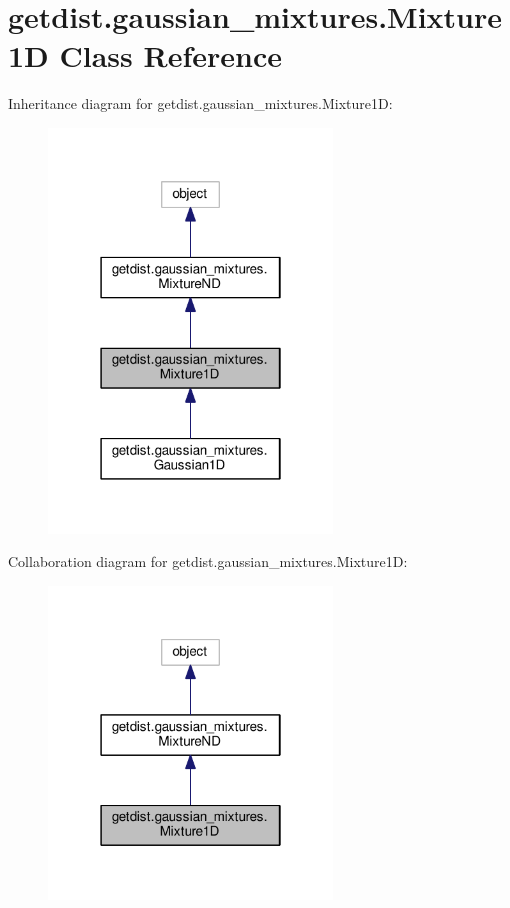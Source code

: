 \hypertarget{classgetdist_1_1gaussian__mixtures_1_1Mixture1D}{}\section{getdist.\+gaussian\+\_\+mixtures.\+Mixture1D Class Reference}
\label{classgetdist_1_1gaussian__mixtures_1_1Mixture1D}


Inheritance diagram for getdist.\+gaussian\+\_\+mixtures.\+Mixture1D\+:
\nopagebreak
\begin{figure}[H]
\begin{center}
\leavevmode
\includegraphics[width=214pt]{classgetdist_1_1gaussian__mixtures_1_1Mixture1D__inherit__graph}
\end{center}
\end{figure}


Collaboration diagram for getdist.\+gaussian\+\_\+mixtures.\+Mixture1D\+:
\nopagebreak
\begin{figure}[H]
\begin{center}
\leavevmode
\includegraphics[width=214pt]{classgetdist_1_1gaussian__mixtures_1_1Mixture1D__coll__graph}
\end{center}
\end{figure}
